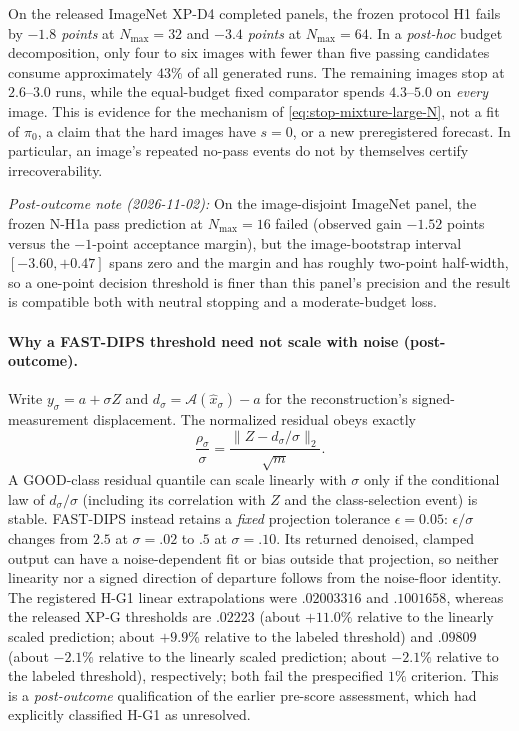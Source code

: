 On the released ImageNet XP-D4 completed panels,
the frozen protocol H1 fails by \emph{$-1.8$ points}
at $N_{\max}=32$ and \emph{$-3.4$ points} at
$N_{\max}=64$. In a \emph{post-hoc}
budget decomposition, only four to six images
with fewer than five passing candidates consume
approximately $43\%$ of all generated runs.
The remaining images stop at $2.6$--$3.0$ runs,
while the equal-budget fixed comparator spends
$4.3$--$5.0$ on \emph{every} image.
This is evidence for the mechanism of
\eqref{eq:stop-mixture-large-N}, not a fit of
$\pi_0$, a claim that the hard images have $s=0$,
or a new preregistered forecast.
In particular, an image's repeated no-pass events
do not by themselves certify irrecoverability.

\noindent\emph{Post-outcome note (2026-11-02):}
On the image-disjoint ImageNet panel, the frozen
N-H1a pass prediction at $N_{\max}=16$ failed
(observed gain $-1.52$ points versus the
$-1$-point acceptance margin), but the
image-bootstrap interval $[-3.60,+0.47]$
spans zero and the margin and has roughly
two-point half-width, so a one-point
decision threshold is finer than this
panel's precision and the result is compatible
both with neutral stopping and a moderate-budget
loss.

\paragraph{Why a FAST-DIPS threshold need not scale with noise (post-outcome).}
Write $y_\sigma=a+\sigma Z$ and
$d_\sigma=\mathcal A(\hat x_\sigma)-a$ for the
reconstruction's signed-measurement displacement.
The normalized residual obeys exactly
\[
 \frac{\rho_\sigma}{\sigma}=
 \frac{\|Z-d_\sigma/\sigma\|_2}{\sqrt m}.
\]
A GOOD-class residual quantile can scale linearly
with $\sigma$ only if the conditional law of
$d_\sigma/\sigma$ (including its correlation with
$Z$ and the class-selection event) is stable.
FAST-DIPS instead retains a \emph{fixed}
projection tolerance $\epsilon=0.05$:
$\epsilon/\sigma$ changes from $2.5$ at
$\sigma=.02$ to $.5$ at $\sigma=.10$.
Its returned denoised, clamped output can have
a noise-dependent fit or bias outside that
projection, so neither linearity nor a signed
direction of departure follows from the
noise-floor identity. The registered H-G1
linear extrapolations were $.02003316$ and
$.1001658$, whereas the released XP-G thresholds
are $.02223$ (about $+11.0\%$ relative to the linearly scaled prediction; about $+9.9\%$ relative to the labeled threshold) and
$.09809$ (about $-2.1\%$ relative to the linearly scaled prediction; about $-2.1\%$ relative to the labeled threshold), respectively;
both fail the prespecified $1\%$ criterion.
This is a \emph{post-outcome} qualification
of the earlier pre-score assessment, which had
explicitly classified H-G1 as unresolved.

